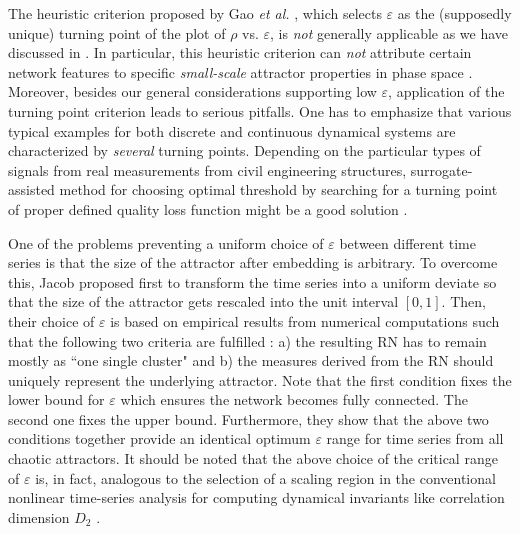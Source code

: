 		The heuristic criterion proposed by Gao {\textit{et al.}} \cite{Gao2009}, which selects $\varepsilon$ as the (supposedly unique) turning point of the plot of $\rho$ vs. $\varepsilon$, is \textit{not} generally applicable as we have discussed in \cite{Donner2010b}. In particular, this heuristic criterion can \textit{not} attribute certain network features to specific \textit{small-scale} attractor properties in phase space \cite{Donner2010b}. Moreover, besides our general considerations supporting low $\varepsilon$, application of the turning point criterion leads to serious pitfalls. One has to emphasize that various typical examples for both discrete and continuous dynamical systems are characterized by \textit{several} turning points. Depending on the particular types of signals from real measurements from civil engineering structures, surrogate-assisted method for choosing optimal threshold by searching for a turning point of proper defined quality loss function might be a good solution \cite{Yang2015a}. 
        
        		One of the problems preventing a uniform choice of $\varepsilon$ between different time series is that the size of the attractor after embedding is arbitrary. To overcome this, Jacob \cite{Jacob2016b} proposed first to transform the time series into a uniform deviate so that the size of the attractor gets rescaled into the unit interval $[0, 1]$. Then, their choice of $\varepsilon$ is based on empirical results from numerical computations such that the following two criteria are fulfilled \cite{Jacob2016b}: a) the resulting RN has to remain mostly as ``one single cluster" and b) the measures derived from the RN should uniquely represent the underlying attractor. Note that the first condition fixes the lower bound for $\varepsilon$ which ensures the network becomes fully connected. The second one fixes the upper bound. Furthermore, they show that the above two conditions together provide an identical optimum $\varepsilon$ range for time series from all chaotic attractors. It should be noted that the above choice of the critical range of $\varepsilon$ is, in fact, analogous to the selection of a scaling region in the conventional nonlinear time-series analysis for computing dynamical invariants like correlation dimension $D_2$ \cite{Grassberger1983PLA}.
		
